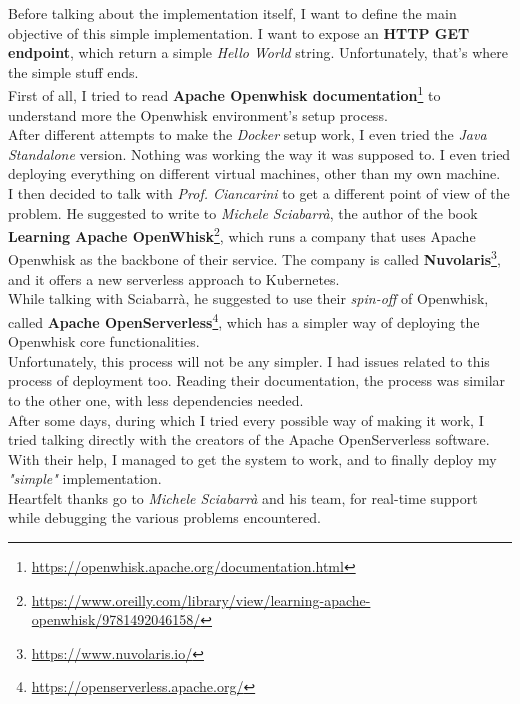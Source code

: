 Before talking about the implementation itself, I want to define the main objective of this simple implementation. I want to expose an \textbf{HTTP GET endpoint}, which return a simple \textit{Hello World} string. Unfortunately, that's where the simple stuff ends.\vspace{14pt}\\
First of all, I tried to read \textbf{Apache Openwhisk documentation}\footnote{\url{https://openwhisk.apache.org/documentation.html}} to understand more the Openwhisk environment's setup process.\\
After different attempts to make the \textit{Docker} setup work, I even tried the \textit{Java Standalone} version. Nothing was working the way it was supposed to. I even tried deploying everything on different virtual machines, other than my own machine.\vspace{14pt}\\
I then decided to talk with \textit{Prof. Ciancarini} to get a different point of view of the problem. He suggested to write to \textit{Michele Sciabarrà}, the author of the book \textbf{Learning Apache OpenWhisk}\footnote{\url{https://www.oreilly.com/library/view/learning-apache-openwhisk/9781492046158/}}, which runs a company that uses Apache Openwhisk as the backbone of their service. The company is called \textbf{Nuvolaris}\footnote{\url{https://www.nuvolaris.io/}}, and it offers a new serverless approach to Kubernetes.\\
While talking with Sciabarrà, he suggested to use their \textit{spin-off} of Openwhisk, called \textbf{Apache OpenServerless}\footnote{\url{https://openserverless.apache.org/}}, which has a simpler way of deploying the Openwhisk core functionalities.\vspace{14pt}\\
Unfortunately, this process will not be any simpler. I had issues related to this process of deployment too. Reading their documentation, the process was similar to the other one, with less dependencies needed.\\
After some days, during which I tried every possible way of making it work, I tried talking directly with the creators of the Apache OpenServerless software. With their help, I managed to get the system to work, and to finally deploy my \textit{"simple"} implementation.\vspace{14pt}\\
Heartfelt thanks go to \textit{Michele Sciabarrà} and his team, for real-time support while debugging the various problems encountered.\\
